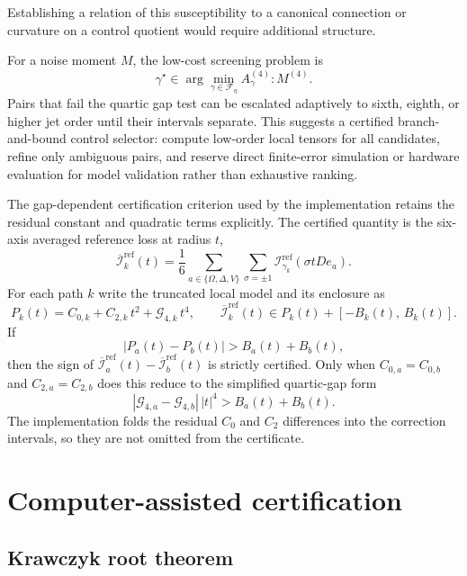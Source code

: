 \documentclass[11pt]{article}
\newcommand{\cF}{\mathcal{F}}
\newcommand{\cI}{\mathcal{I}}
\newcommand{\cG}{\mathcal{G}}
\begin{document}
Establishing a relation of this susceptibility to a canonical connection or curvature on a control quotient would require additional structure.

For a noise moment $M$, the low-cost screening problem is
\[
\gamma^\star
\in
\arg\min_{\gamma\in\cF_\eta}
A^{(4)}_\gamma:M^{(4)}.
\]
Pairs that fail the quartic gap test can be escalated adaptively to sixth, eighth, or higher jet order until their intervals separate. This suggests a certified branch-and-bound control selector: compute low-order local tensors for all candidates, refine only ambiguous pairs, and reserve direct finite-error simulation or hardware evaluation for model validation rather than exhaustive ranking.

The gap-dependent certification criterion used by the implementation retains the residual constant and quadratic terms explicitly. The certified quantity is the six-axis averaged reference loss at radius $t$,
\begin{equation}
\overline{\cI}^{\mathrm{ref}}_k(t)
=
\frac{1}{6}
\sum_{a\in\{\Omega,\Delta,V\}}
\sum_{\sigma=\pm1}
\cI^{\mathrm{ref}}_{\gamma_k}(\sigma t D e_a).
\label{eq:avloss}
\end{equation}
For each path $k$ write the truncated local model and its enclosure as
\begin{equation}
P_k(t)=C_{0,k}+C_{2,k}\,t^2+\cG_{4,k}\,t^4,
\qquad
\overline{\cI}^{\mathrm{ref}}_k(t)\in P_k(t)+[-B_k(t),\,B_k(t)].
\label{eq:gapmodel}
\end{equation}
If
\begin{equation}
|P_a(t)-P_b(t)|>B_a(t)+B_b(t),
\label{eq:gap}
\end{equation}
then the sign of $\overline{\cI}^{\mathrm{ref}}_a(t)-\overline{\cI}^{\mathrm{ref}}_b(t)$ is strictly certified. Only when $C_{0,a}=C_{0,b}$ and $C_{2,a}=C_{2,b}$ does this reduce to the simplified quartic-gap form
\[
|\cG_{4,a}-\cG_{4,b}|\,|t|^4>B_a(t)+B_b(t).
\]
The implementation folds the residual $C_0$ and $C_2$ differences into the correction intervals, so they are not omitted from the certificate.

\section{Computer-assisted certification}

\subsection{Krawczyk root theorem}
\end{document}
